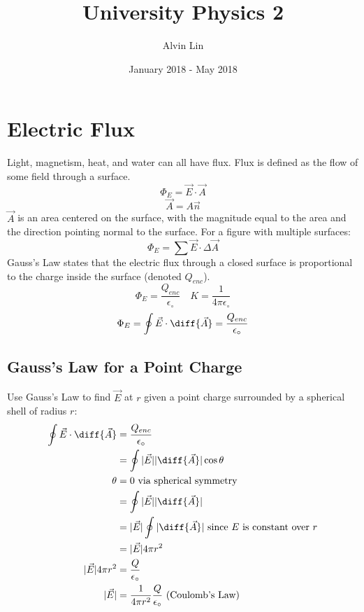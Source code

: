 \documentclass{math}
\title{University Physics 2}
\author{Alvin Lin}
\date{January 2018 - May 2018}
\begin{document}
\maketitle

\section*{Electric Flux}
Light, magnetism, heat, and water can all have flux. Flux is defined as the flow
of some field through a surface.
\[ \Phi_{E} = \vec{E}\cdot\vec{A} \]
\[ \vec{A} = A\vec{n} \]
\( \vec{A} \) is an area centered on the surface, with the magnitude equal to
the area and the direction pointing normal to the surface. For a figure with
multiple surfaces:
\[ \Phi_E = \sum\vec{E}\cdot\Delta\vec{A} \]
Gauss's Law states that the electric flux through a closed surface is
proportional to the charge inside the surface (denoted \( Q_{enc} \)).
\[ \Phi_E = \frac{Q_{enc}}{\epsilon_{\circ}} \quad
  K = \frac{1}{4\pi\epsilon_{\circ}} \]
\[ \Phi_E = \oint\vec{E}\cdot\diff{\vec{A}} =
  \frac{Q_{enc}}{\epsilon_{\circ}} \]

\subsection*{Gauss's Law for a Point Charge}
\begin{center}
\end{center}
Use Gauss's Law to find \( \vec{E} \) at \( r \) given a point charge surrounded
by a spherical shell of radius \( r \):
\begin{align*}
  \oint\vec{E}\cdot\diff{\vec{A}} &= \frac{Q_{enc}}{\epsilon_{\circ}} \\
  &= \oint|\vec{E}||\diff{\vec{A}}|\cos\theta \\
  \theta &= 0 \text{ via spherical symmetry} \\
  &= \oint|\vec{E}||\diff{\vec{A}}| \\
  &= |\vec{E}|\oint|\diff{\vec{A}}|
    \text{ since } E \text{ is constant over } r \\
  &= |\vec{E}|4\pi r^2 \\
  |\vec{E}|4\pi r^2 &= \frac{Q}{\epsilon_{\circ}} \\
  |\vec{E}| &= \frac{1}{4\pi r^2}\frac{Q}{\epsilon_{\circ}}
    \text{ (Coulomb's Law)}
\end{align*}
\end{document}
